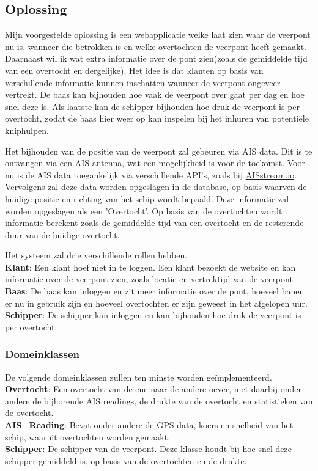 \documentclass[11pt]{article}
\begin{document}
\subsection{Oplossing}
Mijn voorgestelde oplossing is een webapplicatie welke laat zien waar de veerpont nu is,
wanneer die betrokken is en welke overtochten de veerpont heeft gemaakt. Daarnaast
wil ik wat extra informatie over de pont zien(zoals de gemiddelde tijd van een overtocht
en dergelijke). Het idee is dat klanten op basis van verschillende informatie kunnen
inschatten wanneer de veerpont ongeveer vertrekt. De baas kan bijhouden hoe vaak de
veerpont over gaat per dag en hoe snel deze is. Als laatste kan de schipper bijhouden
hoe druk de veerpont is per overtocht, zodat de baas hier weer op kan inspelen bij het
inhuren van potentiële kniphulpen.
\par\smallskip
Het bijhouden van de positie van de veerpont zal gebeuren via AIS data.
Dit is te ontvangen via een AIS antenna, wat een mogelijkheid is voor de toekomst.
 Voor nu is de AIS data toegankelijk via verschillende API's, zoals bij \href{https://aisstream.io}{AISstream.io}.
Vervolgens zal deze data worden opgeslagen in de database, op basis waarven de huidige positie en richting van het schip wordt bepaald. Deze informatie zal worden opgeslagen als een 'Overtocht'. Op basis van de overtochten wordt informatie berekent zoals de gemiddelde tijd van een overtocht en de resterende duur van de huidige overtocht.
\par\smallskip 
Het systeem zal drie verschillende rollen hebben. \\
\textbf{Klant}: Een klant hoef niet in te loggen. Een klant bezoekt de website en kan informatie over de veerpont zien, zoals locatie en vertrektijd van de veerpont.\\
\textbf{Baas}: De baas kan inloggen en zit meer informatie over de pont, hoeveel banen er nu in gebruik zijn en hoeveel overtochten er zijn geweest in het afgelopen uur.\\
\textbf{Schipper}: De schipper kan inloggen en kan bijhouden hoe druk de veerpont is per overtocht. \\

\subsubsection{Domeinklassen}
De volgende domeinklassen zullen ten minste worden geïmplementeerd. \\
\textbf{Overtocht}: Een overtocht van de ene naar de andere oever, met daarbij onder andere de bijhorende AIS readings, de drukte van de overtocht en statistieken van de overtocht. \\
\textbf{AIS\_Reading}: Bevat onder andere de GPS data, koers en snelheid van het schip, waaruit overtochten worden gemaakt. \\
\textbf{Schipper}: De schipper van de veerpont. Deze klasse houdt bij hoe snel deze schipper gemiddeld is, op basis van de overtochten en de drukte. \\
\end{document}
